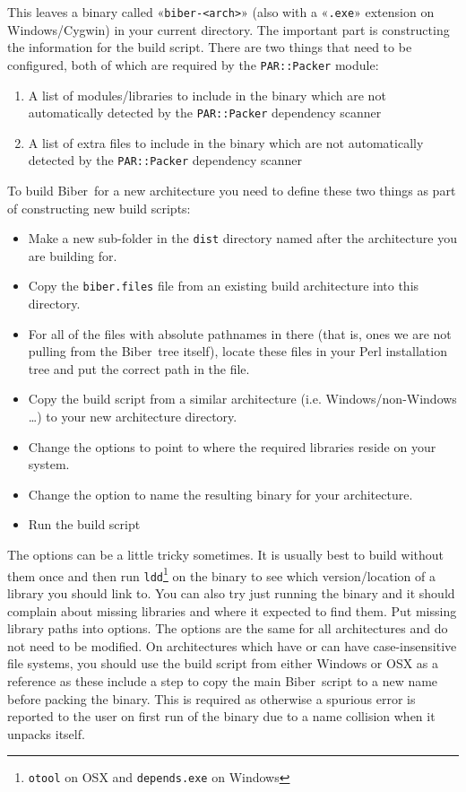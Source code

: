 \documentclass{ltxdockit}
\newcommand*{\biber}{Biber\xspace}
\begin{document}
\noindent This leaves a binary called «\verb+biber-<arch>+» (also with
a «\verb+.exe+» extension on Windows/Cygwin) in your current directory.
The important part is constructing the information for the build
script. There are two things that need to be configured, both of
which are required by the \verb+PAR::Packer+ module:

\begin{enumerate}
\item A list of modules/libraries to include in the binary which are not
  automatically detected by the \verb+PAR::Packer+ dependency
  scanner
\item A list of extra files to include in the binary which are not
  automatically detected by the \verb+PAR::Packer+ dependency
  scanner
\end{enumerate}

\noindent To build \biber\ for a new architecture you need to
define these two things as part of constructing new build scripts:

\begin{itemize}
\item Make a new sub-folder in the \verb+dist+ directory named after the
  architecture you are building for.
\item Copy the \verb+biber.files+ file from an existing build
  architecture into this directory.
\item For all of the files with absolute pathnames in there (that is,
  ones we are not pulling from the \biber\ tree itself), locate these
  files in your Perl installation tree and put the correct path in the
  file.
\item Copy the build script from a similar architecture
  (i.e. Windows/non-Windows \ldots) to your new architecture
  directory. 
\item Change the  options to point to where the required
  libraries reside on your system.
\item Change the  option to name the resulting binary
  for your architecture.
\item Run the build script
\end{itemize}

\noindent The  options can be a little tricky sometimes. It is
usually best to build without them once and then run
\verb+ldd+\footnote{\texttt{otool} on OSX and \texttt{depends.exe} on Windows}
on the binary to see which version/location of a library you should link
to. You can also try just running the binary and it should complain about
missing libraries and where it expected to find them. Put missing library
paths into  options. The  options are the same
for all architectures and do not need to be modified. On architectures
which have or can have case-insensitive file systems, you should use the
build script from either Windows or OSX as a reference as these include a
step to copy the main \biber\ script to a new name before packing the
binary. This is required as otherwise a spurious error is reported to the
user on first run of the binary due to a name collision when it unpacks
itself.
\end{document}
